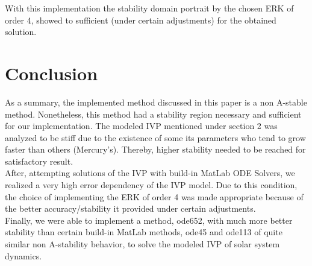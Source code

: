 \documentclass[a4paper]{article}
\begin{document}
With this implementation the stability domain portrait by the chosen ERK of order 4, showed to sufficient (under certain adjustments) for the obtained solution. 

\pagebreak

\section{Conclusion}
As a summary, the implemented method discussed in this paper is a non A-stable method. Nonetheless, this method had a stability region necessary and sufficient for our implementation. The modeled IVP mentioned under section 2 was analyzed to be stiff due to the existence of some its parameters who tend to grow faster than others (Mercury's). Thereby, higher stability needed to be reached for satisfactory result.\\

After, attempting solutions of the IVP with build-in MatLab ODE Solvers, we realized a very high error dependency of the IVP model. Due to this condition, the choice of implementing the ERK of order 4 was made appropriate because of the better accuracy/stability it provided under certain adjustments.\\

Finally, we were able to implement a method, ode652, with much more better stability than certain build-in MatLab methods, ode45 and ode113 of quite similar non A-stability behavior, to solve the modeled IVP of solar system dynamics.\\ 

\pagebreak


\pagebreak
\end{document}
